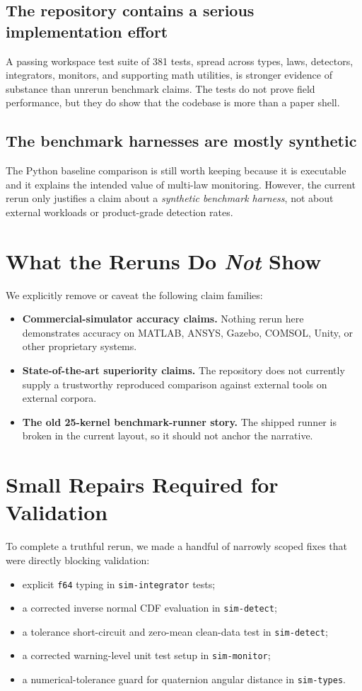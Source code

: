 \documentclass[11pt]{article}
\begin{document}
\subsection{The repository contains a serious implementation effort}
A passing workspace test suite of 381 tests, spread across types, laws, detectors, integrators, monitors, and supporting math utilities, is stronger evidence of substance than unrerun benchmark claims. The tests do not prove field performance, but they do show that the codebase is more than a paper shell.

\subsection{The benchmark harnesses are mostly synthetic}
The Python baseline comparison is still worth keeping because it is executable and it explains the intended value of multi-law monitoring. However, the current rerun only justifies a claim about a \emph{synthetic benchmark harness}, not about external workloads or product-grade detection rates.

\section{What the Reruns Do \emph{Not} Show}
We explicitly remove or caveat the following claim families:

\begin{itemize}
  \item \textbf{Commercial-simulator accuracy claims.} Nothing rerun here demonstrates accuracy on MATLAB, ANSYS, Gazebo, COMSOL, Unity, or other proprietary systems.
  \item \textbf{State-of-the-art superiority claims.} The repository does not currently supply a trustworthy reproduced comparison against external tools on external corpora.
  \item \textbf{The old 25-kernel benchmark-runner story.} The shipped runner is broken in the current layout, so it should not anchor the narrative.
\end{itemize}

\section{Small Repairs Required for Validation}
To complete a truthful rerun, we made a handful of narrowly scoped fixes that were directly blocking validation:

\begin{itemize}
  \item explicit \texttt{f64} typing in \texttt{sim-integrator} tests;
  \item a corrected inverse normal CDF evaluation in \texttt{sim-detect};
  \item a tolerance short-circuit and zero-mean clean-data test in \texttt{sim-detect};
  \item a corrected warning-level unit test setup in \texttt{sim-monitor};
  \item a numerical-tolerance guard for quaternion angular distance in \texttt{sim-types}.
\end{itemize}
\end{document}
